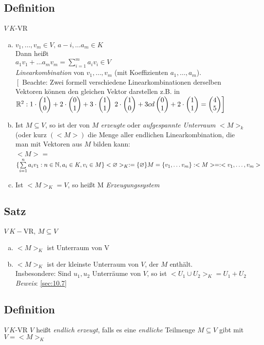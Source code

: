 \subsection{Definition}
$V\ K$-VR
\begin{enumerate}[a)]
\item $v_1,\ldots,v_m \in V,\,a-i,\ldots a_m \in K$\\
Dann hei\ss t\\
$a_1v_1+\ldots a_mv_m = \sum\limits^{m}_{i=1} a_i v_i \in V$\\
\emph{Linearkombination} von $v_1,\ldots,v_m$ (mit Koeffizienten $a_1,\ldots,a_m$).\\
$\left\lbrack\right. $ Beachte: Zwei formell verschiedene Linearkombinationen derselben Vektoren können den gleichen Vektor darstellen z.B. in $\mathbb{R}^2:\:\\
1\cdot \begin{pmatrix} 1\\0 \end{pmatrix} + 2 \cdot \begin{pmatrix} 0\\1 \end{pmatrix} + 3 \cdot \begin{pmatrix} 1\\1 \end{pmatrix}\\
\left.2 \cdot \begin{pmatrix} 1\\0 \end{pmatrix} + 3 cd \begin{pmatrix} 0\\1 \end{pmatrix} + 2 \cdot \begin{pmatrix} 1\\1 \end{pmatrix} = \begin{pmatrix} 4\\5 \end{pmatrix}\right\rbrack$
\item Ist $M \subseteq V$, so ist der von $M$ \emph{erzeugte} oder \emph{aufgespannte Unterraum} $<M>_k$ (oder kurz $(<M>)$ die Menge aller endlichen Linearkombination, die man mit Vektoren aus $M$ bilden kann:\\
$<M>$ = $\{ \sum\limits_{i=1}^{n}a_iv_1 : n \in \mathbb{N},a_i \in K,v_i \in M \}\\
<\varnothing>_K:= \{\varnothing\}\\
M = \{ v_1,\ldots v_m \} : <M> =: <v_1,\ldots,v_m>$
\item Ist $<M>_K = V$, so hei\ss t M \emph{Erzeugungssystem}
\end{enumerate}
\subsection{Satz}
$V\ K-$VR, $M \subseteq V$
\begin{enumerate}[a)]
\item $<M>_K$ ist Unterraum von V
\item $<M>_K$ ist der kleinste Unterraum von $V$, der $M$ enthält.\\
Insbesondere: Sind $u_1,u_2$ Unterräume von $V$, so ist $<U_1 \cup U_2>_K = U_1 + U_2$\\
\emph{Beweis}: \ref{sec:10.7}
\end{enumerate}
\subsection{Definition}
$V\ K$-VR $V$ hei\ss t \emph{endlich erzeugt}, falls es eine \emph{endliche} Teilmenge $M \subseteq V$ gibt mit $V = <M>_K$
